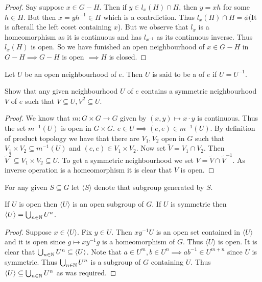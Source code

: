 \documentclass{article}
\begin{document}
\begin{proof}
    Say suppose $x\in G-H$. Then if $y\in l_x(H)\cap H$, then $y=xh$ for some $h\in H$. But then $x=yh^{-1}\in H$ which is a contrdiction. Thus $l_x(H)\cap H=\phi$(It is afterall the left coset containing $x$). 
    But we observe that $l_x$ is a homeomorphism as it is continuous and has $l_{x^{-1}}$ as its continuous inverse. Thus $l_x(H)$ is open. So we have funished an open neighbourhood of $x\in G-H$ in $G-H\implies G-H$ is open
    $\implies H$ is closed. 
\end{proof}

\begin{definition}
    Let $U$ be an open neighbourhood of $e$. Then $U$ is said to be a  of $e$ if $U=U^{-1}$.
\end{definition}

\begin{exercise*}
    Show that any given neighbourhood $U$ of $e$ contains a symmetric neighbourhood $V$ of $e$ such that $V\subseteq U,V^2\subseteq U$.
\end{exercise*}
\begin{proof}
    We know that $m:G\times G\to G$ given by $(x,y)\mapsto x\cdot y$ is continuous. Thus the set $m^{-1}(U)$ is open in $G\times G$. $e\in U\implies (e,e)\in m^{-1}(U)$. By definition of product topology we have that there are $V_1,V_2$ open in $G$ such that 
    $V_1\times V_2\subseteq m^{-1}(U)$ and $(e,e)\in V_1\times V_2$. Now set $\tilde{V} = V_1\cap V_2$. Then $\tilde{V}^2 \subseteq V_1\times V_2\subseteq U$. To get a symmetric neighbourhood we set $V = \tilde{V}\cap \tilde{V}^{-1}$. As inverse operation is a 
    homeomorphism it is clear that $V$ is open.
\end{proof}

For any given $S\subseteq G$ let $\langle S\rangle$ denote that subgroup generated by $S$. 

\begin{exercise*}
    If $U$ is open then $\langle U\rangle$ is an open subgroup of $G$. If $U$ is symmetric then $\langle U\rangle = \bigcup_{n\in \mathbb N}U^n$.
\end{exercise*}
\begin{proof}
    Suppose $x\in \langle U\rangle$. Fix $y\in U$. Then $xy^{-1}U$ is an open set contained in $\langle U\rangle$ and it is open since $g\mapsto xy^{-1}g$ is a homeomorphism of $G$.
    Thus $\langle U\rangle$ is open. It is clear that $\bigcup_{n\in \mathbb N}U^n\subseteq \langle U\rangle$. Note that $a\in U^m,b\in U^n\implies ab^{-1}\in U^{m+n}$ since $U$ is symmetric. 
    Thus $\bigcup_{n\in \mathbb N}U^n$ is a subgroup of $G$ containing $U$. Thus $\langle U\rangle \subseteq \bigcup_{n\in \mathbb N}U^n$ as was required.
\end{proof}
\end{document}
